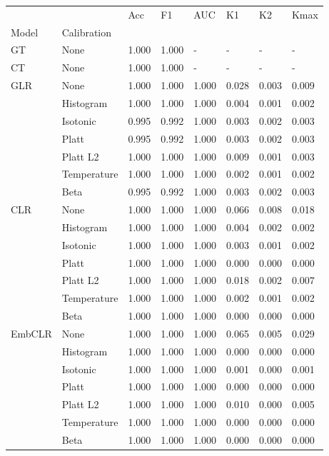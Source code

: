 \begin{tabular}{llllllll}
\toprule
 &  & Acc & F1 & AUC & K1 & K2 & Kmax \\
Model & Calibration &  &  &  &  &  &  \\
\midrule
GT & None & 1.000 & 1.000 & - & - & - & - \\
\cline{1-8}
CT & None & 1.000 & 1.000 & - & - & - & - \\
\cline{1-8}
\multirow[t]{7}{*}{GLR} & None & 1.000 & 1.000 & 1.000 & 0.028 & 0.003 & 0.009 \\
 & Histogram & 1.000 & 1.000 & 1.000 & 0.004 & 0.001 & 0.002 \\
 & Isotonic & 0.995 & 0.992 & 1.000 & 0.003 & 0.002 & 0.003 \\
 & Platt & 0.995 & 0.992 & 1.000 & 0.003 & 0.002 & 0.003 \\
 & Platt L2 & 1.000 & 1.000 & 1.000 & 0.009 & 0.001 & 0.003 \\
 & Temperature & 1.000 & 1.000 & 1.000 & 0.002 & 0.001 & 0.002 \\
 & Beta & 0.995 & 0.992 & 1.000 & 0.003 & 0.002 & 0.003 \\
\cline{1-8}
\multirow[t]{7}{*}{CLR} & None & 1.000 & 1.000 & 1.000 & 0.066 & 0.008 & 0.018 \\
 & Histogram & 1.000 & 1.000 & 1.000 & 0.004 & 0.002 & 0.002 \\
 & Isotonic & 1.000 & 1.000 & 1.000 & 0.003 & 0.001 & 0.002 \\
 & Platt & 1.000 & 1.000 & 1.000 & 0.000 & 0.000 & 0.000 \\
 & Platt L2 & 1.000 & 1.000 & 1.000 & 0.018 & 0.002 & 0.007 \\
 & Temperature & 1.000 & 1.000 & 1.000 & 0.002 & 0.001 & 0.002 \\
 & Beta & 1.000 & 1.000 & 1.000 & 0.000 & 0.000 & 0.000 \\
\cline{1-8}
\multirow[t]{7}{*}{EmbCLR} & None & 1.000 & 1.000 & 1.000 & 0.065 & 0.005 & 0.029 \\
 & Histogram & 1.000 & 1.000 & 1.000 & 0.000 & 0.000 & 0.000 \\
 & Isotonic & 1.000 & 1.000 & 1.000 & 0.001 & 0.000 & 0.001 \\
 & Platt & 1.000 & 1.000 & 1.000 & 0.000 & 0.000 & 0.000 \\
 & Platt L2 & 1.000 & 1.000 & 1.000 & 0.010 & 0.000 & 0.005 \\
 & Temperature & 1.000 & 1.000 & 1.000 & 0.000 & 0.000 & 0.000 \\
 & Beta & 1.000 & 1.000 & 1.000 & 0.000 & 0.000 & 0.000 \\
\cline{1-8}
\bottomrule
\end{tabular}

